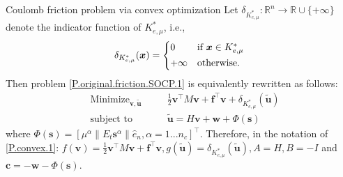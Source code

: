 \documentclass[8pt,red]{beamer}
\theoremstyle{plain}
\theoremstyle{definition}
\theoremstyle{remark}
\newcommand{\MIN}{\mathop{\mathrm{Minimize}}}
\newcommand{\ST}{\mathop{\mathrm{subject~to}}}
\newcommand{\overRe}{\ensuremath{\Re\cup\{+\infty\}}}
\renewcommand{\Re}{\ensuremath{\mathbb{R}}}
\newcommand{\bi}[1]{\ensuremath{\boldsymbol{#1}}}
\begin{document}
\begin{frame}{Coulomb friction problem via convex optimization}
Let $\delta_{K_{e,\mu}^{*}} : \Re^{n} \to \overRe$ denote the 
indicator function of $K_{e,\mu}^{*}$, i.e., 
\begin{align}
  \delta_{K_{e,\mu}^{*}}(\bi{x}) = 
  \begin{dcases*}
    0 
    & if $\bi{x} \in K_{e,\mu}^{*}$ \\
    +\infty
    & otherwise. 
  \end{dcases*}
\end{align}
Then problem \eqref{P.original.friction.SOCP.1} is equivalently rewritten as follows:
 \begin{subequations}\label{P.quadratic.SOCP.2}%
   \begin{alignat}{3}
     & \MIN_{\bi{v}, \tilde{\bi{u}}}  &{\quad}& 
    \frac{1}{2} \bi{v}^{\top} M \bi{v} + \bi{f}^{\top} \bi{v} + \delta_{K_{e,\mu}^{*}}(\tilde{\bi{u}}) \\
     & \ST & & 
     \tilde{\bi{u}} = H \bi{v} + \bi{w} + \Phi(\bi{s})   
   \end{alignat}
 \end{subequations} 
where $\Phi(\bi{s}) = [\mu^{\alpha} \| E_{t} \bi{s}^{\alpha} \| \hat{e}_{n}, \alpha = 1...n_{c}]^{\top}$. Therefore, in the notation of \eqref{P.convex.1}: $f(\bi{v}) = \frac{1}{2} \bi{v}^{\top} M \bi{v} + \bi{f}^{\top} \bi{v}, g(\tilde{\bi{u}}) = \delta_{K_{e,\mu}^{*}}(\tilde{\bi{u}}), A = H , B = -I$ and $\bi{c} = -\bi{w} -\Phi(\bi{s})$.
\end{frame}
\end{document}
